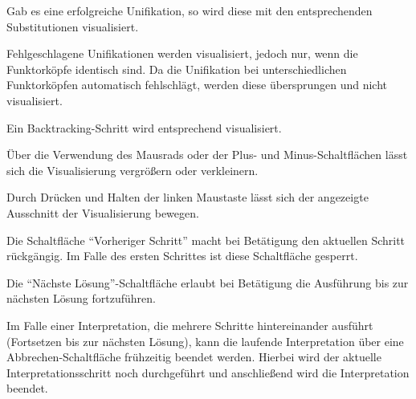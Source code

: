 \documentclass[parskip=full,11pt,twoside]{scrartcl}
\begin{document}
Gab es eine erfolgreiche Unifikation, so wird diese mit den entsprechenden Substitutionen visualisiert.


Fehlgeschlagene Unifikationen werden visualisiert, jedoch nur, wenn die Funktorköpfe identisch sind. Da die Unifikation bei unterschiedlichen Funktorköpfen automatisch fehlschlägt, werden diese übersprungen und nicht visualisiert.


Ein Backtracking-Schritt wird entsprechend visualisiert.


Über die Verwendung des Mausrads oder der Plus- und Minus-Schaltflächen lässt sich die Visualisierung vergrößern oder verkleinern.


Durch Drücken und Halten der linken Maustaste lässt sich der angezeigte Ausschnitt der Visualisierung bewegen.


Die Schaltfläche \enquote{Vorheriger Schritt} macht bei Betätigung den aktuellen Schritt rückgängig. Im Falle des ersten Schrittes ist diese Schaltfläche gesperrt.


Die \enquote{Nächste Lösung}-Schaltfläche erlaubt bei Betätigung die Ausführung bis zur nächsten Lösung fortzuführen.


Im Falle einer Interpretation, die mehrere Schritte hintereinander ausführt (Fortsetzen bis zur nächsten Lösung), kann die laufende Interpretation über eine Abbrechen-Schaltfläche frühzeitig beendet werden. Hierbei wird der aktuelle Interpretationsschritt noch durchgeführt und anschließend wird die Interpretation beendet.
\end{document}
